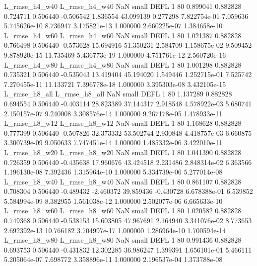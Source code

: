  L_rmse_h4_w40  L_rmse_h4_w40                   NaN      small     DEFL                 1 80 0.899041       0.882828 0.724711       0.506440   -0.506542      1.836554     43.099139     0.277298   7.822754e-01  7.059636 5.745626e-10     8.736947   3.175821e-13            1.000000    2.660225e-07        1.384658e-10
 L_rmse_h4_w60  L_rmse_h4_w60                   NaN      small     DEFL                 1 80 1.021387       0.882828 0.766498       0.506440   -0.573628     15.694916     51.350231     2.584709   1.158675e-02  9.509452 9.878920e-15    11.735469   5.436773e-19            1.000000    4.751761e-12        2.560720e-16
 L_rmse_h4_w80  L_rmse_h4_w80                   NaN      small     DEFL                 1 80 1.001298       0.882828 0.735321       0.506440   -0.535043     13.419404     45.194020     1.549446   1.252715e-01  7.525742 7.270455e-11    11.133721   7.396778e-18            1.000000    3.395303e-08        3.432105e-15
 L_rmse_h8_all  L_rmse_h8_all                   NaN      small     DEFL                 1 80 1.137289       0.882828 0.694554       0.506440   -0.403114     28.823389     37.144317     2.918548   4.578922e-03  5.680741 2.150157e-07     9.240008   3.308576e-14            1.000000    9.267178e-05        1.478933e-11
 L_rmse_h8_w12  L_rmse_h8_w12                   NaN      small     DEFL                 1 80 1.168628       0.882828 0.777399       0.506440   -0.507826     32.373332     53.502744     2.930848   4.418757e-03  6.660875 3.300739e-09     9.050633   7.747451e-14            1.000000    1.485332e-06        3.422010e-11
 L_rmse_h8_w20  L_rmse_h8_w20                   NaN      small     DEFL                 1 80 1.041390       0.882828 0.726359       0.506440   -0.435638     17.960676     43.424518     2.231486   2.848314e-02  6.363566 1.196130e-08     7.392436   1.315964e-10            1.000000    5.334739e-06        5.277014e-08
 L_rmse_h8_w40  L_rmse_h8_w40                   NaN      small     DEFL                 1 80 0.861107       0.882828 0.708304       0.506440   -0.489432     -2.460372     39.859436    -0.430728   6.678388e-01  6.539852 5.584994e-09     8.382955   1.561038e-12            1.000000    2.502077e-06        6.665633e-10
 L_rmse_h8_w60  L_rmse_h8_w60                   NaN      small     DEFL                 1 80 1.020582       0.882828 0.749368       0.506440   -0.538153     15.603805     47.967691     2.164940   3.341076e-02  8.773653 2.692392e-13    10.766182   3.704997e-17            1.000000    1.286964e-10        1.700594e-14
 L_rmse_h8_w80  L_rmse_h8_w80                   NaN      small     DEFL                 1 80 0.991436       0.882828 0.693753       0.506440   -0.431832     12.302285     36.986247     1.399391   1.656101e-01  5.466111 5.205064e-07     7.698772   3.358896e-11            1.000000    2.196537e-04        1.373788e-08
